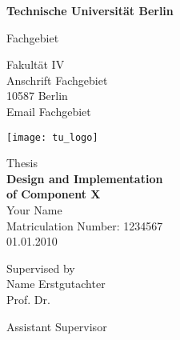 \thispagestyle{empty}
\begin{center}

\vspace*{1.4cm}
{\LARGE \textbf{Technische Universität Berlin}}

\vspace{0.5cm}

{\large Fachgebiet\\[1mm]}

Fakultät IV\\
Anschrift Fachgebiet\\
10587 Berlin\\
Email Fachgebiet\\

\vspace*{1cm}

\texttt{[image: tu\_logo]}

\vspace*{1.0cm}

{\LARGE Thesis}\\

\vspace{1.0cm}
{\LARGE \textbf{Design and Implementation}}\\
\vspace*{0.3cm}
{\LARGE \textbf{of Component X}}\\
\vspace*{1.0cm}
{\LARGE Your Name}
\\
\vspace*{0.5cm}
Matriculation Number: 1234567\\
01.01.2010\\ %
\vspace*{1.0cm}

Supervised by\\
Name Erstgutachter\\
Prof. Dr. 

\vspace*{0.5cm}
Assistant Supervisor\\
\vspace{3cm}


\end{center}


